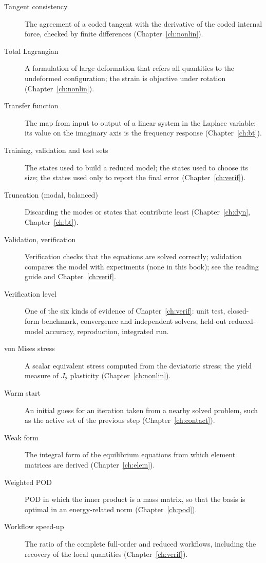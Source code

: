 \begin{description}
\item[Tangent consistency] The agreement of a coded tangent with the derivative of the coded internal force, checked by finite differences (Chapter~\ref{ch:nonlin}).
\item[Total Lagrangian] A formulation of large deformation that refers all quantities to the undeformed configuration; the strain is objective under rotation (Chapter~\ref{ch:nonlin}).
\item[Transfer function] The map from input to output of a linear system in the Laplace variable; its value on the imaginary axis is the frequency response (Chapter~\ref{ch:bt}).
\item[Training, validation and test sets] The states used to build a reduced model; the states used to choose its size; the states used only to report the final error (Chapter~\ref{ch:verif}).
\item[Truncation (modal, balanced)] Discarding the modes or states that contribute least (Chapter~\ref{ch:dyn}, Chapter~\ref{ch:bt}).
\item[Validation, verification] Verification checks that the equations are solved correctly; validation compares the model with experiments (none in this book); see the reading guide and Chapter~\ref{ch:verif}.
\item[Verification level] One of the six kinds of evidence of Chapter~\ref{ch:verif}: unit test, closed-form benchmark, convergence and independent solvers, held-out reduced-model accuracy, reproduction, integrated run.
\item[von Mises stress] A scalar equivalent stress computed from the deviatoric stress; the yield measure of $J_2$ plasticity (Chapter~\ref{ch:nonlin}).
\item[Warm start] An initial guess for an iteration taken from a nearby solved problem, such as the active set of the previous step (Chapter~\ref{ch:contact}).
\item[Weak form] The integral form of the equilibrium equations from which element matrices are derived (Chapter~\ref{ch:elem}).
\item[Weighted POD] POD in which the inner product is a mass matrix, so that the basis is optimal in an energy-related norm (Chapter~\ref{ch:pod}).
\item[Workflow speed-up] The ratio of the complete full-order and reduced workflows, including the recovery of the local quantities (Chapter~\ref{ch:verif}).
\end{description}
